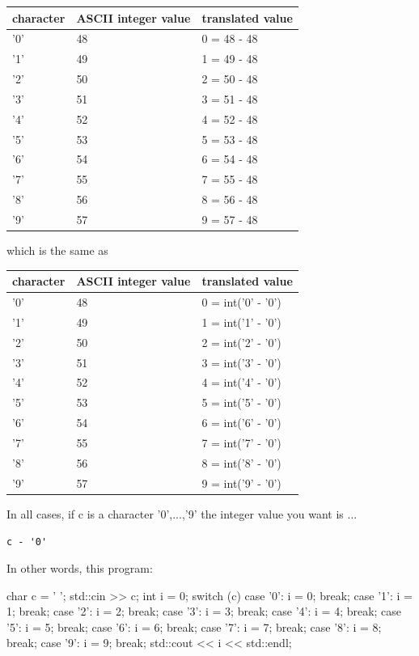 \begin{tabular}{lll}
character & ASCII integer value & translated value \\
\hline
'0' & 48 & 0 = 48 - 48 \\
'1' & 49 & 1 = 49 - 48 \\
'2' & 50 & 2 = 50 - 48 \\
'3' & 51 & 3 = 51 - 48 \\
'4' & 52 & 4 = 52 - 48 \\
'5' & 53 & 5 = 53 - 48 \\
'6' & 54 & 6 = 54 - 48 \\
'7' & 55 & 7 = 55 - 48 \\
'8' & 56 & 8 = 56 - 48 \\
'9' & 57 & 9 = 57 - 48 \\
\end{tabular}

which is the same as

\begin{tabular}{lll}
character & ASCII integer value & translated value \\
\hline
'0' & 48 & 0 = int('0' - '0') \\
'1' & 49 & 1 = int('1' - '0') \\
'2' & 50 & 2 = int('2' - '0') \\
'3' & 51 & 3 = int('3' - '0') \\
'4' & 52 & 4 = int('4' - '0') \\
'5' & 53 & 5 = int('5' - '0') \\
'6' & 54 & 6 = int('6' - '0') \\
'7' & 55 & 7 = int('7' - '0') \\
'8' & 56 & 8 = int('8' - '0') \\
'9' & 57 & 9 = int('9' - '0') \\
\end{tabular}

In all cases, if c is a character '0',...,'9' the integer value you want is ...

\begin{center}
\verb!c - '0'!
\end{center}

 In other words, this program:

\begin{consolethree}[escapeinside=||]
char c = ' ';
std::cin >> c;
int i = 0;
switch (c)
{
    case '0': i = 0; break;
    case '1': i = 1; break;
    case '2': i = 2; break;
    case '3': i = 3; break;
    case '4': i = 4; break;
    case '5': i = 5; break;
    case '6': i = 6; break;
    case '7': i = 7; break;
    case '8': i = 8; break;
    case '9': i = 9; break;
}
std::cout << i << std::endl;
\end{consolethree}

